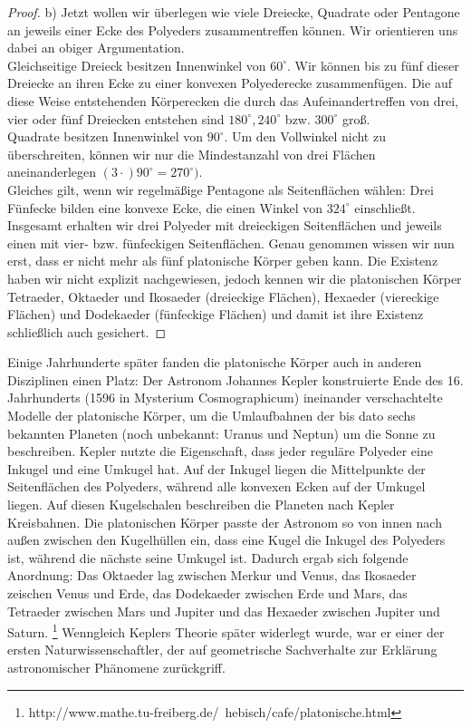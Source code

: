 \begin{proof}
b) Jetzt wollen wir überlegen wie viele Dreiecke, Quadrate oder Pentagone an jeweils einer Ecke des Polyeders zusammentreffen können. Wir orientieren uns dabei an obiger Argumentation.\\
Gleichseitige Dreieck besitzen Innenwinkel von $60^\circ$. Wir können bis zu fünf dieser Dreiecke an ihren Ecke zu einer konvexen Polyederecke zusammenfügen. Die auf diese Weise entstehenden Körperecken die durch das Aufeinandertreffen von drei, vier oder fünf Dreiecken entstehen sind  $180^\circ, 240^\circ$ bzw. $300^\circ$ groß.\\
Quadrate besitzen Innenwinkel von $90^\circ$. Um den Vollwinkel nicht zu überschreiten, können wir nur die Mindestanzahl von drei Flächen aneinanderlegen $(3\cdot)90^\circ=270^\circ)$.\\
Gleiches gilt, wenn wir regelmäßige Pentagone als Seitenflächen wählen: Drei Fünfecke bilden eine konvexe Ecke, die einen Winkel von $324^\circ$ einschließt.\\
Insgesamt erhalten wir drei Polyeder mit dreieckigen Seitenflächen und jeweils einen mit vier- bzw. fünfeckigen Seitenflächen. Genau genommen wissen wir nun erst, dass er nicht mehr als fünf platonische Körper geben kann. Die Existenz haben wir nicht explizit nachgewiesen, jedoch kennen wir die platonischen Körper Tetraeder, Oktaeder und  Ikosaeder (dreieckige Flächen), Hexaeder (viereckige Flächen) und Dodekaeder (fünfeckige Flächen) und damit ist ihre Existenz schließlich auch gesichert. 
\end{proof}
Einige Jahrhunderte später fanden die platonische Körper auch in anderen Disziplinen einen Platz: 
Der Astronom Johannes Kepler konstruierte Ende des 16. Jahrhunderts (1596 in Mysterium Cosmographicum) ineinander verschachtelte Modelle der platonische Körper, um die Umlaufbahnen der bis dato sechs bekannten Planeten (noch unbekannt: Uranus und Neptun) um die Sonne zu beschreiben. Kepler nutzte die Eigenschaft, dass jeder reguläre Polyeder eine Inkugel und eine Umkugel hat. Auf der Inkugel liegen die Mittelpunkte der Seitenflächen des Polyeders, während alle konvexen Ecken auf der Umkugel liegen. Auf diesen Kugelschalen beschreiben die Planeten nach Kepler Kreisbahnen. Die platonischen Körper passte der Astronom so von innen nach außen zwischen den Kugelhüllen ein, dass eine Kugel die Inkugel des Polyeders ist, während die nächste seine Umkugel ist. Dadurch ergab sich folgende Anordnung: Das Oktaeder lag zwischen Merkur und Venus, das Ikosaeder zeischen Venus und Erde, das Dodekaeder zwischen Erde und Mars, das Tetraeder zwischen Mars und Jupiter und das Hexaeder zwischen Jupiter und Saturn. \footnote{http://www.mathe.tu-freiberg.de/~hebisch/cafe/platonische.html}  Wenngleich Keplers Theorie später widerlegt wurde, war er einer der ersten Naturwissenschaftler, der auf geometrische Sachverhalte zur Erklärung astronomischer Phänomene zurückgriff.\\
